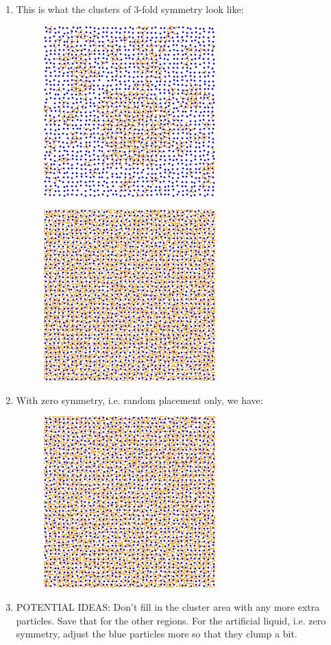 \documentclass[12pt,reqno]{amsart}
\numberwithin{equation}{section}
\begin{document}
\begin{enumerate}
\begin{figure}[H]
\end{figure}
\item This is what the clusters of 3-fold symmetry look like:
\begin{figure}[H]
\centering
\includegraphics[scale=0.6]{3-fold-clusters}
\end{figure}
\begin{figure}[H]
\centering
\includegraphics[scale=0.6]{3-fold-cluster-full}
\end{figure}
\item With zero symmetry, i.e. random placement only, we have:
\begin{figure}[H]
\centering
\includegraphics[scale=0.6]{zero-symmetry}
\end{figure}
\item POTENTIAL IDEAS: Don't fill in the cluster area with any more extra particles.  Save that for the other regions.  For the artificial liquid, i.e. zero symmetry, adjust the blue particles more so that they clump a bit.  
\end{enumerate}
\end{document}
